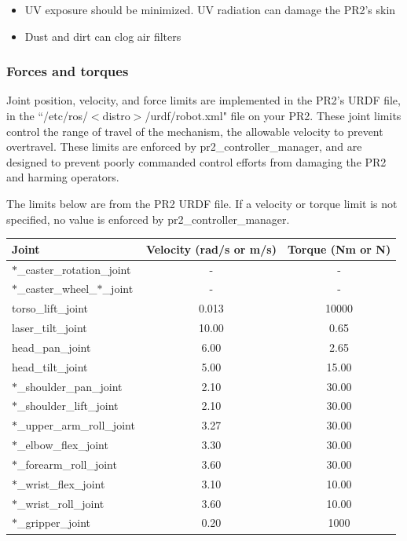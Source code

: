 \begin{itemize}
\item UV exposure should be minimized. UV radiation can damage the PR2's skin
\item Dust and dirt can clog air filters
\end{itemize}

\subsubsection{Forces and torques}

Joint position, velocity, and force limits are implemented in the PR2's URDF
file, in the ``/etc/ros/$<$distro$>$/urdf/robot.xml" file on your PR2. These joint limits
control the range of travel of the mechanism, the allowable velocity to prevent
overtravel. These limits are enforced by pr2\_controller\_manager, and are
designed to prevent poorly commanded control efforts from damaging the PR2 and
harming operators.

The limits below are from the PR2 URDF file. If a velocity or torque limit is
not specified, no value is enforced by pr2\_controller\_manager.

\begin{tabular}{l*{2}{c}}
Joint  & Velocity (rad/s or m/s) & Torque (Nm or N) \\
\hline \hline
$\ast$\_caster\_rotation\_joint        & -     & -  \\
$\ast$\_caster\_wheel\_$\ast$\_joint   & -     & -  \\
torso\_lift\_joint                     & 0.013 & 10000 \\
laser\_tilt\_joint                     & 10.00 & 0.65  \\
head\_pan\_joint                       & 6.00  & 2.65  \\
head\_tilt\_joint                      & 5.00  & 15.00 \\
$\ast$\_shoulder\_pan\_joint           & 2.10  & 30.00 \\
$\ast$\_shoulder\_lift\_joint          & 2.10  & 30.00 \\
$\ast$\_upper\_arm\_roll\_joint        & 3.27  & 30.00 \\
$\ast$\_elbow\_flex\_joint             & 3.30  & 30.00 \\
$\ast$\_forearm\_roll\_joint           & 3.60  & 30.00 \\
$\ast$\_wrist\_flex\_joint             & 3.10  & 10.00 \\
$\ast$\_wrist\_roll\_joint             & 3.60  & 10.00 \\
$\ast$\_gripper\_joint                 & 0.20  & 1000  \\
\end{tabular}

